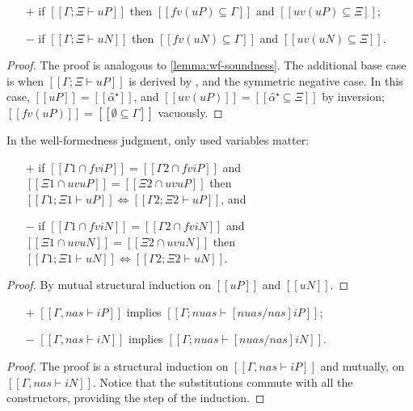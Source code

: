\begin{lemma}
    \label{lemma:wf-algo-soundness}
    \hfill
  \begin{itemize}
    \item[$+$] if $[[Γ ; Ξ ⊢ uP]]$ then $[[fv(uP) ⊆ Γ]]$ and $[[uv(uP) ⊆ Ξ]]$;
    \item[$-$] if $[[Γ ; Ξ ⊢ uN]]$ then $[[fv(uN) ⊆ Γ]]$ and $[[uv(uN) ⊆ Ξ]]$.
  \end{itemize}
\end{lemma}
\begin{proof}
  The proof is analogous to \cref{lemma:wf-soundness}.
  The additional base case is when $[[Γ ; Ξ ⊢ uP]]$ is derived by ,
  and the symmetric negative case.
  In this case, $[[uP]] = [[α̂⁺]]$, and $[[uv(uP)]] = [[{α̂⁺} ⊆ Ξ]]$ by inversion; $[[fv(uP)]] = [[∅ ⊆ Γ]]$ vacuously.
\end{proof}

\begin{lemma}
  \label{lemma:wf-algo-ctxt-equiv}
  In the well-formedness judgment, only used variables matter:
  \begin{itemize}
  \item[$+$] if $[[Γ1 ∩ fv iP]] = [[Γ2 ∩ fv iP]]$
    and $[[Ξ1 ∩ uv uP]] = [[Ξ2 ∩ uv uP]]$ then
    $[[Γ1 ; Ξ1 ⊢ uP]] \iff [[Γ2 ; Ξ2 ⊢ uP]]$, and
  \item[$-$] if $[[Γ1 ∩ fv iN]] = [[Γ2 ∩ fv iN]]$
    and $[[Ξ1 ∩ uv uN]] = [[Ξ2 ∩ uv uN]]$ then
    $[[Γ1 ; Ξ1 ⊢ uN]] \iff [[Γ2 ; Ξ2 ⊢ uN]]$.
  \end{itemize}
\end{lemma}
\begin{proof}
  By mutual structural induction on $[[uP]]$ and $[[uN]]$.
\end{proof}

\begin{lemma}
  \label{lemma:var-algo-wf}
  \hfill
  \begin{itemize}
    \item[$+$]  $[[Γ, nas ⊢ iP]]$ implies $[[Γ; {nuas} ⊢ [nuas/nas]iP]]$;
    \item[$-$]  $[[Γ, nas ⊢ iN]]$ implies $[[Γ; {nuas} ⊢ [nuas/nas]iN]]$.
  \end{itemize}
\end{lemma}
\begin{proof}
  The proof is a structural induction on $[[Γ, nas ⊢ iP]]$ and mutually, on $[[Γ, nas ⊢ iN]]$.
  Notice that the substitutions commute with all the constructors,
  providing the step of the induction. 
\end{proof}

